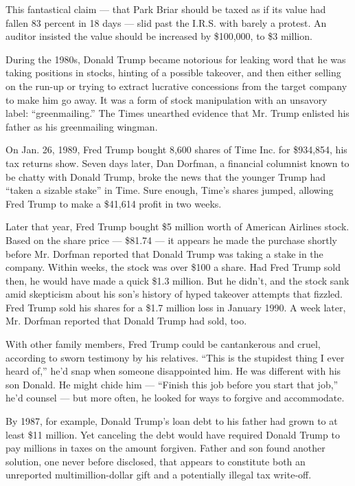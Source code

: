 This fantastical claim --- that Park Briar should be taxed as if its
value had fallen 83 percent in 18 days --- slid past the I.R.S. with
barely a protest. An auditor insisted the value should be increased by
\$100,000, to \$3 million.

During the 1980s, Donald Trump became notorious for leaking word that he
was taking positions in stocks, hinting of a possible takeover, and then
either selling on the run-up or trying to extract lucrative concessions
from the target company to make him go away. It was a form of stock
manipulation with an unsavory label: ``greenmailing.'' The Times
unearthed evidence that Mr. Trump enlisted his father as his
greenmailing wingman.

On Jan. 26, 1989, Fred Trump bought 8,600 shares of Time Inc. for
\$934,854, his tax returns show. Seven days later, Dan Dorfman, a
financial columnist known to be chatty with Donald Trump, broke the news
that the younger Trump had ``taken a sizable stake'' in Time. Sure
enough, Time's shares jumped, allowing Fred Trump to make a \$41,614
profit in two weeks.

Later that year, Fred Trump bought \$5 million worth of American
Airlines stock. Based on the share price --- \$81.74 --- it appears he
made the purchase shortly before Mr. Dorfman reported that Donald Trump
was taking a stake in the company. Within weeks, the stock was over
\$100 a share. Had Fred Trump sold then, he would have made a quick
\$1.3 million. But he didn't, and the stock sank amid skepticism about
his son's history of hyped takeover attempts that fizzled. Fred Trump
sold his shares for a \$1.7 million loss in January 1990. A week later,
Mr. Dorfman reported that Donald Trump had sold, too.

With other family members, Fred Trump could be cantankerous and cruel,
according to sworn testimony by his relatives. ``This is the stupidest
thing I ever heard of,'' he'd snap when someone disappointed him. He was
different with his son Donald. He might chide him --- ``Finish this job
before you start that job,'' he'd counsel --- but more often, he looked
for ways to forgive and accommodate.

By 1987, for example, Donald Trump's loan debt to his father had grown
to at least \$11 million. Yet canceling the debt would have required
Donald Trump to pay millions in taxes on the amount forgiven. Father and
son found another solution, one never before disclosed, that appears to
constitute both an unreported multimillion-dollar gift and a potentially
illegal tax write-off.

